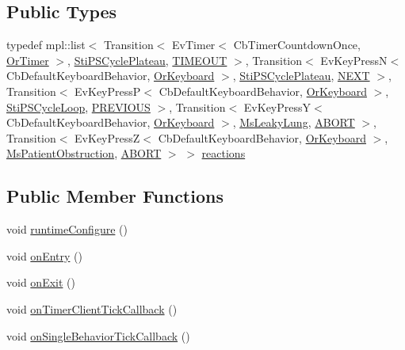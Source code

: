 \subsection*{Public Types}
\begin{DoxyCompactItemize}
\item 
typedef mpl\+::list$<$ Transition$<$ Ev\+Timer$<$ Cb\+Timer\+Countdown\+Once, \hyperlink{classsm__respira__1_1_1OrTimer}{Or\+Timer} $>$, \hyperlink{structsm__respira__1_1_1cmv__cycle__inner__states_1_1StiPSCyclePlateau}{Sti\+P\+S\+Cycle\+Plateau}, \hyperlink{structsm__respira__1_1_1cmv__cycle__inner__states_1_1StiPSCycleInspire_1_1TIMEOUT}{T\+I\+M\+E\+O\+UT} $>$, Transition$<$ Ev\+Key\+PressN$<$ Cb\+Default\+Keyboard\+Behavior, \hyperlink{classsm__respira__1_1_1OrKeyboard}{Or\+Keyboard} $>$, \hyperlink{structsm__respira__1_1_1cmv__cycle__inner__states_1_1StiPSCyclePlateau}{Sti\+P\+S\+Cycle\+Plateau}, \hyperlink{structsm__respira__1_1_1cmv__cycle__inner__states_1_1StiPSCycleInspire_1_1NEXT}{N\+E\+XT} $>$, Transition$<$ Ev\+Key\+PressP$<$ Cb\+Default\+Keyboard\+Behavior, \hyperlink{classsm__respira__1_1_1OrKeyboard}{Or\+Keyboard} $>$, \hyperlink{structsm__respira__1_1_1cmv__cycle__inner__states_1_1StiPSCycleLoop}{Sti\+P\+S\+Cycle\+Loop}, \hyperlink{structsm__respira__1_1_1cmv__cycle__inner__states_1_1StiPSCycleInspire_1_1PREVIOUS}{P\+R\+E\+V\+I\+O\+US} $>$, Transition$<$ Ev\+Key\+PressY$<$ Cb\+Default\+Keyboard\+Behavior, \hyperlink{classsm__respira__1_1_1OrKeyboard}{Or\+Keyboard} $>$, \hyperlink{classsm__respira__1_1_1MsLeakyLung}{Ms\+Leaky\+Lung}, \hyperlink{classABORT}{A\+B\+O\+RT} $>$, Transition$<$ Ev\+Key\+PressZ$<$ Cb\+Default\+Keyboard\+Behavior, \hyperlink{classsm__respira__1_1_1OrKeyboard}{Or\+Keyboard} $>$, \hyperlink{classsm__respira__1_1_1MsPatientObstruction}{Ms\+Patient\+Obstruction}, \hyperlink{classABORT}{A\+B\+O\+RT} $>$ $>$ \hyperlink{structsm__respira__1_1_1cmv__cycle__inner__states_1_1StiPSCycleInspire_a623cee3fa3b09047379a349a8391b204}{reactions}
\end{DoxyCompactItemize}
\subsection*{Public Member Functions}
\begin{DoxyCompactItemize}
\item 
void \hyperlink{structsm__respira__1_1_1cmv__cycle__inner__states_1_1StiPSCycleInspire_afa2d2360bb3a678a6c96cf8ffd0564bb}{runtime\+Configure} ()
\item 
void \hyperlink{structsm__respira__1_1_1cmv__cycle__inner__states_1_1StiPSCycleInspire_ac8ff5d913f0eff6be554f57b4b97951d}{on\+Entry} ()
\item 
void \hyperlink{structsm__respira__1_1_1cmv__cycle__inner__states_1_1StiPSCycleInspire_a6b96fc078cecf7a370b565255d18833f}{on\+Exit} ()
\item 
void \hyperlink{structsm__respira__1_1_1cmv__cycle__inner__states_1_1StiPSCycleInspire_ae80efcc3db4156c258e3b6cb08e9e1bb}{on\+Timer\+Client\+Tick\+Callback} ()
\item 
void \hyperlink{structsm__respira__1_1_1cmv__cycle__inner__states_1_1StiPSCycleInspire_a7fca128bf0d16cc63e801542a55fd682}{on\+Single\+Behavior\+Tick\+Callback} ()
\end{DoxyCompactItemize}
